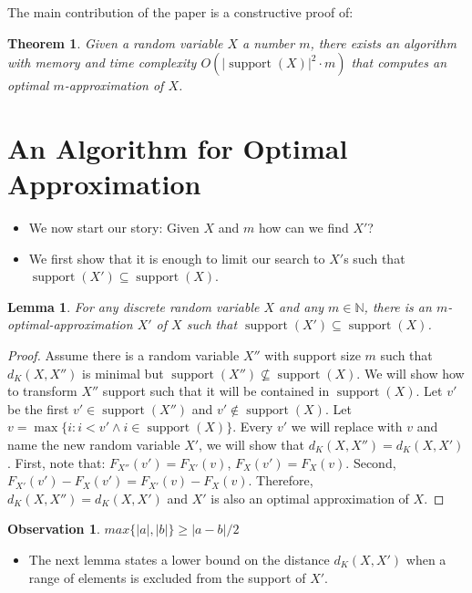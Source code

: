 \documentclass{article}
\newtheorem{lemma}[thm]{Lemma}
\newtheorem{observation}[thm]{Observation}
\newtheorem{theorem}[thm]{Theorem}
\DeclareMathOperator{\support}{support}
\begin{document}
The main contribution of the paper is a constructive proof of:
\begin{theorem}
	Given a random variable $X$ a number $m$, there exists an algorithm with memory and time complexity $O(|\support(X)|^2 \cdot m)$  that computes an optimal $m$-approximation of $X$.
\end{theorem}


\section{An Algorithm for Optimal Approximation}


\begin{itemize}
	\item We now start our story: Given $X$ and $m$ how can we find $X'$?
	\item We first show that it is enough to limit our search to $X'$s such that $\support(X') \subseteq \support(X)$.
\end{itemize}

\begin{lemma}
	For any discrete random variable $X$ and any $m \in \mathbb{N}$, there is an $m$-optimal-approximation $X'$ of $X$ such that $\support(X') \subseteq \support(X)$.
\end{lemma}
\begin{proof}
Assume there is a random variable $X''$ with support size $m$ such that $d_K(X,X'')$ is minimal but $\support(X'')\nsubseteq\support(X)$.
We will show how to transform $X''$ support such that it will be contained in $\support(X)$. Let $v'$ be the first $v'\in\support(X'')$ and $v' \not\in\support(X)$. Let $v=\max\{i: i<v' \wedge i\in\support(X)\}$. Every $v'$ we will replace with $v$ and name the new random variable $X'$, we will show that $d_K(X,X'') = d_K(X,X')$. First, note that:
$F_{X''}(v')=F_{X'}(v)$, $F_{X}(v')=F_{X}(v)$.
Second,  $F_{X'}(v')-F_{X}(v') = F_{X'}(v)-F_{X}(v)$. Therefore, $d_K(X,X'') = d_K(X,X')$ and $X'$ is also an optimal approximation of $X$.
\end{proof}

\begin{observation}\label{obs:ab}
	$max\{|a|,|b|\} \geq |a-b|/2$
\end{observation}

\begin{itemize}
	\item The next lemma states a lower bound on the distance $d_K(X,X')$ when a range of elements is excluded from the support of $X'$.
\end{itemize}
\end{document}
